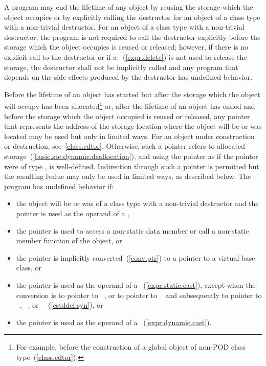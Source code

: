 \pnum
A program may end the lifetime of any object by reusing the storage
which the object occupies or by explicitly calling the destructor for an
object of a class type with a non-trivial destructor. For an object of a
class type with a non-trivial destructor, the program is not required to
call the destructor explicitly before the storage which the object
occupies is reused or released; however, if there is no explicit call to
the destructor or if a ~(\ref{expr.delete})
is not used to release the storage, the destructor shall not be
implicitly called and any program that depends on the side effects
produced by the destructor has undefined behavior.

\pnum
Before the lifetime of an object has started but after the storage which
the object will occupy has been allocated\footnote{For example, before the
construction of a global object of
non-POD class type~(\ref{class.cdtor}).}
or, after the lifetime of an object has ended and before the storage
which the object occupied is reused or released, any pointer that represents the address of
the storage location where the object will be or was located may be
used but only in limited ways.
For an object under construction or destruction, see~\ref{class.cdtor}.
Otherwise, such
a pointer refers to allocated
storage~(\ref{basic.stc.dynamic.deallocation}), and using the pointer as
if the pointer were of type , is
well-defined. Indirection through such a pointer is permitted but the resulting lvalue may only be used in
limited ways, as described below. The
program has undefined behavior if:
\begin{itemize}
\item
  the object will be or was of a class type with a non-trivial destructor
  and the pointer is used as the operand of a ,
\item
  the pointer is used to access a non-static data member or call a
  non-static member function of the object, or
\item
  the pointer is implicitly converted~(\ref{conv.ptr}) to a pointer
  to a virtual base class, or
\item
  the pointer is used as the operand of a
  ~(\ref{expr.static.cast}), except when the conversion
  is to pointer to \cv{}~, or to pointer to \cv{}~
  and subsequently to pointer to
  \cv{}~,
  \cv{}~, or
  \cv{}~~(\ref{cstddef.syn}), or
\item
  the pointer is used as the operand of a
  ~(\ref{expr.dynamic.cast}).
\end{itemize}
